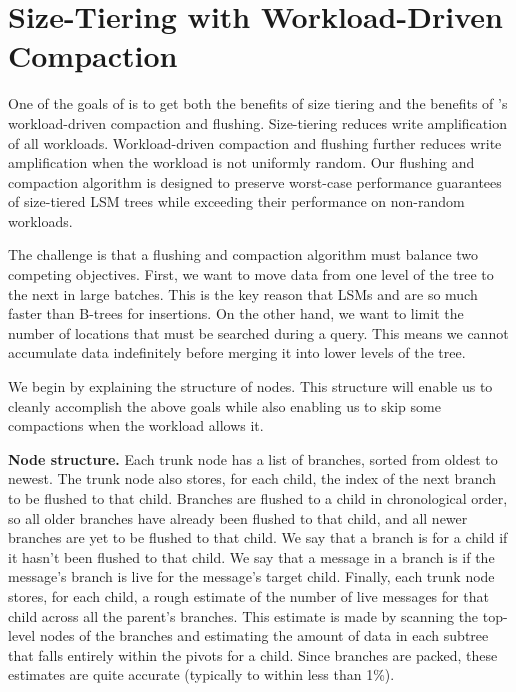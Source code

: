 \section{Size-Tiering with Workload-Driven Compaction}\label{sec:flush-compact}

One of the goals of \sysname is to get both the benefits of size
tiering and the benefits of \bet's workload-driven compaction and
flushing.  Size-tiering reduces write amplification of all
workloads. Workload-driven compaction and flushing further reduces
write amplification when the workload is not uniformly random.
Our flushing and compaction algorithm is designed to preserve
worst-case performance guarantees of size-tiered LSM trees while
exceeding their performance on non-random workloads.  

The challenge is that a flushing and compaction algorithm must balance
two competing objectives.  First, we want to move data from one level
of the tree to the next in large batches.  This is the key reason
that LSMs and \bets are so much faster than B-trees for insertions.
On the other hand, we want to limit the number of locations that must
be searched during a query.  This means we cannot accumulate data
indefinitely before merging it into lower levels of the tree.

We begin by explaining the structure of \datastruct nodes.  This
structure will enable us to cleanly accomplish the above goals while
also enabling us to skip some compactions when the workload allows
it.

\textbf{Node structure.}  Each trunk node has a list of branches,
sorted from oldest to newest.  The trunk node also stores, for each
child, the index of the next branch to be flushed to that child.
Branches are flushed to a child in chronological order, so all older
branches have already been flushed to that child, and all newer
branches are yet to be flushed to that child.  We say that a branch is
 for a child if it hasn't been flushed to that child.  We
say that a message in a branch is  if the message's branch
is live for the message's target child.  Finally, each trunk node
stores, for each child, a rough estimate of the number of live
messages for that child across all the parent's branches.  This
estimate is made by scanning the top-level nodes of the branches and
estimating the amount of data in each subtree that falls entirely
within the pivots for a child.  Since branches are packed, these
estimates are quite accurate (typically to within less than 1\%).

